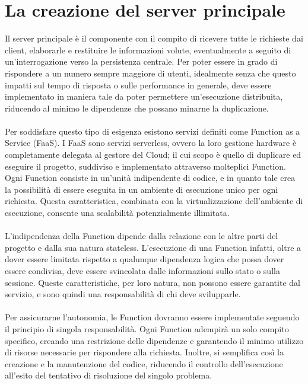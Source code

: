 \section{La creazione del server principale}

Il server principale è il componente con il compito di ricevere tutte le richieste dai client,
elaborarle e restituire le informazioni volute,
eventualmente a seguito di un'interrogazione verso la persistenza centrale.
Per poter essere in grado di rispondere a un numero sempre maggiore di utenti,
idealmente senza che questo impatti sul tempo di risposta o sulle performance in generale,
deve essere implementato in maniera tale da poter permettere un'esecuzione distribuita,
riducendo al minimo le dipendenze che possano minarne la duplicazione.\\
\\
Per soddisfare questo tipo di esigenza
esistono servizi definiti come Function as a Service (FaaS).
I FaaS sono servizi serverless,
ovvero la loro gestione hardware è completamente delegata al gestore del Cloud;
il cui scopo è quello di duplicare ed eseguire il progetto,
suddiviso e implementato attraverso molteplici Function.
Ogni Function consiste in un'unità indipendente di codice,
e in quanto tale crea la possibilità di essere eseguita in un ambiente di esecuzione unico per ogni richiesta.
Questa caratteristica, combinata con la virtualizzazione dell’ambiente di esecuzione,
consente una scalabilità potenzialmente illimitata.\\
\\
L’indipendenza della Function dipende dalla relazione con le altre parti del progetto e
dalla sua natura stateless.
L'esecuzione di una Function infatti,
oltre a dover essere limitata rispetto a qualunque dipendenza logica che possa dover essere condivisa,
deve essere svincolata dalle informazioni sullo stato o sulla sessione.
Queste caratteristiche, per loro natura, non possono essere garantite dal servizio,
e sono quindi una responsabilità di chi deve svilupparle.\\
\\
Per assicurarne l'autonomia,
le Function dovranno essere implementate seguendo il principio di singola responsabilità.
Ogni Function adempirà un solo compito specifico,
creando una restrizione delle dipendenze e
garantendo il minimo utilizzo di risorse necessarie per rispondere alla richiesta.
Inoltre, si semplifica così la creazione e la manutenzione del codice,
riducendo il controllo dell'esecuzione all'esito del tentativo di risoluzione del singolo problema.
\clearpage
